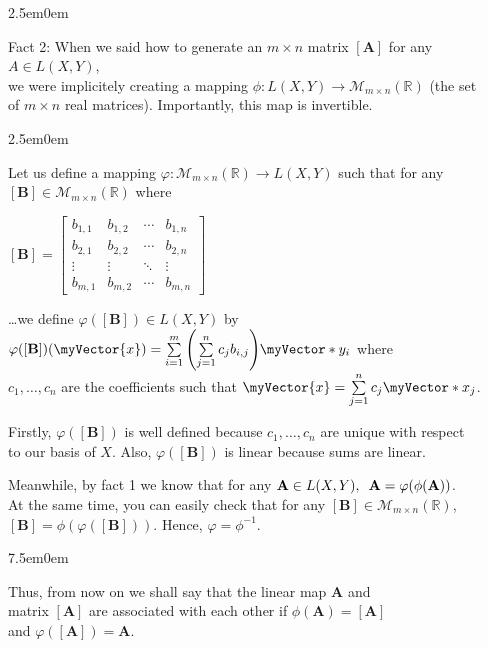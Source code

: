 \documentclass{book}
\newcommand{\hThree}{%
   \color{PineGreen!85!Orange}
   \fontsize{13}{15}\selectfont%
}
\newcommand{\hFour}{%
   \color{Cerulean}
   \fontsize{12}{14}\selectfont%
}
\newenvironment{myIndent}{%
   \begin{adjustwidth}{2.5em}{0em}%
}{%
   \end{adjustwidth}%
}
\newenvironment{myTindent}{%
   \begin{adjustwidth}{7.5em}{0em}%
}{%
   \end{adjustwidth}%
}
\newcommand{\uuline}[2][.]{%
{\vphantom{a}\color{#1}%
\rlap{\rule[-0.18em]{\widthof{#2}}{0.06em}}%
\rlap{\rule[-0.32em]{\widthof{#2}}{0.06em}}}%
#2}
\newcommand{\myHS}{ \hspace{0.5em}}
\newcommand{\retTwo}{\hfill\bigbreak}
\newcommand{\mVec}[1]{\myVector{#1}}
\newcommand{\mVecAst}[1]{\myVector*{#1}}
\newcommand{\mMat}[1]{\mathbf{#1}}
\begin{document}
{\begin{myIndent}
   \uuline{Fact 2}: When we said how to generate an $m\times n$ matrix $[\mMat{A}]$ for any $A \in L(X, Y)$,\\ we were implicitely creating a mapping $\phi : L(X, Y) \longrightarrow \mathcal{M}_{m\times n}(\mathbb{R})$ (the set\\ of $m\times n$ real matrices). Importantly, this map is invertible.\\  [-8pt]
   
   {\begin{myIndent}\hThree
      Let us define a mapping $\varphi: \mathcal{M}_{m\times n}(\mathbb{R}) \longrightarrow L(X, Y)$ such that for any\\ $[\mMat{B}] \in \mathcal{M}_{m\times n}(\mathbb{R})$ where

      {\centering $[\mMat{B}] = \begin{bmatrix}
         b_{1,1} & b_{1,2} & \cdots & b_{1,n} \\
         b_{2,1} & b_{2,2} & \cdots & b_{2,n} \\
         \vdots & \vdots & \ddots & \vdots \\
         b_{m,1} & b_{m,2} & \cdots & b_{m,n}
      \end{bmatrix}$\retTwo\par}

      \dots we define $\varphi([\mMat{B}]) \in L(X, Y)$ by $\varphi([\mMat{B}])(\mVec{x}) = \sum\limits_{i=1}^m\left(\sum\limits_{j=1}^n c_jb_{i,j}\right)\hspace{-0.2em}\mVecAst{y}_i$ where\\ [-4pt] $c_1, \ldots, c_n$ are the coefficients such that $\mVec{x} = \sum\limits_{j=1}^n c_j\mVecAst{x}_j$.\retTwo

      Firstly, $\varphi([\mMat{B}])$ is well defined because $c_1, \ldots, c_n$ are unique with respect\\ to our basis of $X$. Also, $\varphi([\mMat{B}])$ is linear because sums are linear.\retTwo

      Meanwhile, by fact 1 we know that for any $\mMat{A} \in L(X, Y),\myHS \mMat{A} = \varphi(\phi(\mMat{A}))$.\\ At the same time, you can easily check that for any $[\mMat{B}] \in \mathcal{M}_{m\times n}(\mathbb{R})$,\\ $[\mMat{B}] = \phi(\varphi([\mMat{B}]))$. Hence, $\varphi = \phi^{-1}$.\retTwo
      
      \begin{myTindent}\hFour
         Thus, from now on we shall say that the linear map $\mMat{A}$ and\\ matrix $[\mMat{A}]$ are associated with each other if $\phi(\mMat{A}) = [\mMat{A}]$\\ and $\varphi([\mMat{A}]) = \mMat{A}$.\\ [5pt]
      \end{myTindent}
   \end{myIndent}}


\end{myIndent}}
\end{document}

